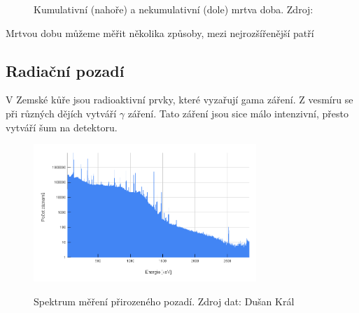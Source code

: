\documentclass[12pt,a4paper]{article}
\begin{document}
\begin{spacing}{1.5}
\begin{figure}[H]
	\caption{ Kumulativní (nahoře) a nekumulativní (dole) mrtva doba. Zdroj: \cite{Knoll2010}}
\end{figure}
Mrtvou dobu můžeme měřit několika způsoby, mezi nejrozšířenější patří   \cite{VUT} %
\subsection{Radiační pozadí}
V Zemské kůře jsou radioaktivní prvky, které vyzařují gama záření. Z vesmíru se při různých dějích vytváří $\gamma$ záření. Tato záření jsou sice málo intenzivní, přesto vytváří šum na detektoru. \\
\begin{figure}[h!]
	\centering
	\includegraphics[width=0.75\textwidth]{pozadi_google.png}
	\label{fig:pozadi}
	\caption{Spektrum měření přirozeného pozadí. Zdroj dat: Dušan Král}%
\end{figure}\\

\end{spacing}
\end{document}
